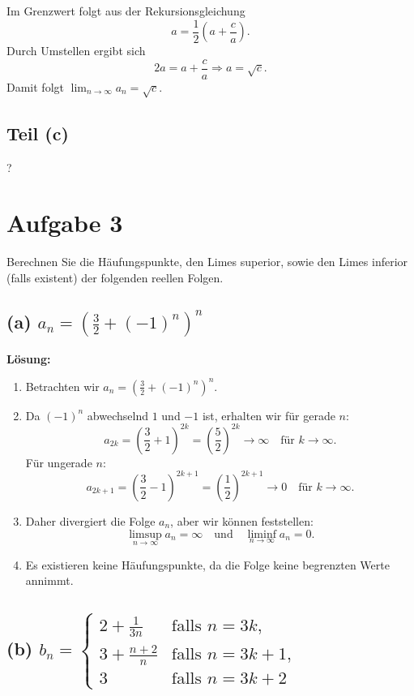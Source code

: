 \documentclass[11pt]{article}
\begin{document}
Im Grenzwert folgt aus der Rekursionsgleichung
\[
a = \frac{1}{2} \left( a + \frac{c}{a} \right).
\]
Durch Umstellen ergibt sich
\[
2a = a + \frac{c}{a} \Rightarrow a = \sqrt{c}.
\]
Damit folgt \( \lim_{n \to \infty} a_n = \sqrt{c} \).

\subsection*{Teil (c)}

?

\section*{Aufgabe 3}

Berechnen Sie die Häufungspunkte, den Limes superior, sowie den Limes inferior (falls existent) der folgenden reellen Folgen.

\subsection*{(a) \( a_n = \left( \frac{3}{2} + (-1)^n \right)^n \)}

\textbf{Lösung:}
\begin{enumerate}
    \item Betrachten wir \( a_n = \left( \frac{3}{2} + (-1)^n \right)^n \).
    \item Da \( (-1)^n \) abwechselnd \( 1 \) und \( -1 \) ist, erhalten wir für gerade \( n \):
        \[
        a_{2k} = \left( \frac{3}{2} + 1 \right)^{2k} = \left( \frac{5}{2} \right)^{2k} \to \infty \quad \text{für } k \to \infty.
        \]
        Für ungerade \( n \):
        \[
        a_{2k+1} = \left( \frac{3}{2} - 1 \right)^{2k+1} = \left( \frac{1}{2} \right)^{2k+1} \to 0 \quad \text{für } k \to \infty.
        \]
    \item Daher divergiert die Folge \( a_n \), aber wir können feststellen:
        \[
        \limsup_{n \to \infty} a_n = \infty \quad \text{und} \quad \liminf_{n \to \infty} a_n = 0.
        \]
    \item Es existieren keine Häufungspunkte, da die Folge keine begrenzten Werte annimmt.
\end{enumerate}

\subsection*{(b) \( b_n = \begin{cases}
2 + \frac{1}{3n} & \text{falls } n = 3k, \\
3 + \frac{n+2}{n} & \text{falls } n = 3k + 1, \\
3 & \text{falls } n = 3k + 2
\end{cases} \)}
\end{document}

